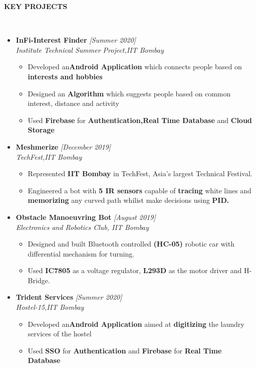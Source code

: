 \documentclass[letterpaper,11pt]{article}
\newcommand{\resheading}[1]{{\small \colorbox{mygrey}{\begin{minipage}{0.975\textwidth}{\textbf{#1 \vphantom{p\^{E}}}}\end{minipage}}}}
\newcommand{\lsep}{-0.5cm}
\newcommand{\isep}{-2 pt}
\newcommand{\sep}{-1 pt}
\begin{document}
\resheading{\textbf{\large{KEY PROJECTS}} }\\[\lsep]
\begin{itemize}\itemsep \sep
\item
\textbf{\noindent \large{InFi-Interest Finder}
} \hfill{\em [Summer 2020]}\\
\emph{Institute Technical Summer Project,IIT Bombay}
 \begin{itemize}\itemsep \isep
 \item{Developed an\textbf{Android Application} which connects people based on \textbf{interests and hobbies}}
 \item{Designed an \textbf{Algorithm} which suggests people based on common interest, distance and activity}
 \item{Used \textbf{Firebase} for \textbf{Authentication,Real Time Database} and \textbf{ Cloud Storage}}
 
 
 
 \end{itemize}
 
 \item
 \textbf{\noindent \large{Meshmerize}
} \hfill{\em [December 2019]}\\
\emph{TechFest,IIT Bombay}
 \begin{itemize}\itemsep \isep
 \item{Represented \textbf{IIT Bombay} in TechFest, Asia's largest Technical Festival.}
 \item{Engineered a bot with {\bf 5 IR sensors} capable of \textbf{tracing} white lines  and \textbf{memorizing} any curved path whilist make decisions using {\bf PID.}}

  \end{itemize}
  \newpage
  
 \item
 \textbf{\noindent \large{ Obstacle Manoeuvring Bot}
} \hfill{\em [August 2019]}\\
\emph{ Electronics and Robotics Club, IIT Bombay}
 \begin{itemize}\itemsep \isep
 \item Designed and built Bluetooth controlled {\bf (HC-05)} robotic car with differential mechanism for turning. 
    \item Used {\bf IC7805} as a voltage regulator, {\bf L293D} as the motor driver and H-Bridge.

  \end{itemize}
  \item
\textbf{\noindent \large{Trident Services}
} \hfill{\em [Summer 2020]}\\
\emph{Hostel-15,IIT Bombay}
 \begin{itemize}\itemsep \isep
 \item{Developed an\textbf{Android Application} aimed  at \textbf{digitizing} the laundry services of the hostel}
 \item{Used \textbf{SSO }for \textbf{Authentication} and\textbf{ Firebase} for \textbf{Real Time Database}}
 \end{itemize}
 
 \end{itemize}
 
\end{document}
